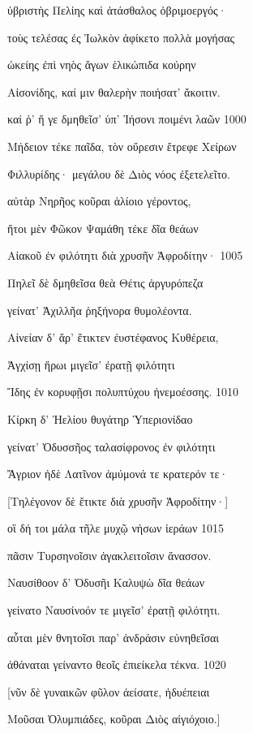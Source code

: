 ὑβριστὴς Πελίης καὶ ἀτάσθαλος ὀβριμοεργός· 

τοὺς τελέσας ἐς Ἰωλκὸν ἀφίκετο πολλὰ μογήσας

ὠκείης ἐπὶ νηὸς ἄγων ἑλικώπιδα κούρην

Αἰσονίδης, καί μιν θαλερὴν ποιήσατ' ἄκοιτιν.

καί ῥ' ἥ γε δμηθεῖσ' ὑπ' Ἰήσονι ποιμένι λαῶν \num{1000} 

Μήδειον τέκε παῖδα, τὸν οὔρεσιν ἔτρεφε Χείρων

Φιλλυρίδης· μεγάλου δὲ Διὸς νόος ἐξετελεῖτο. 

αὐτὰρ Νηρῆος κοῦραι ἁλίοιο γέροντος,

ἤτοι μὲν Φῶκον Ψαμάθη τέκε δῖα θεάων

Αἰακοῦ ἐν φιλότητι διὰ χρυσῆν Ἀφροδίτην· \num{1005} 

Πηλεῖ δὲ δμηθεῖσα θεὰ Θέτις ἀργυρόπεζα

γείνατ' Ἀχιλλῆα ῥηξήνορα θυμολέοντα.

Αἰνείαν δ' ἄρ' ἔτικτεν ἐυστέφανος Κυθέρεια,

Ἀγχίσῃ ἥρωι μιγεῖσ' ἐρατῇ φιλότητι 

Ἴδης ἐν κορυφῇσι πολυπτύχου ἠνεμοέσσης. \num{1010}

Κίρκη δ' Ἠελίου θυγάτηρ Ὑπεριονίδαο

γείνατ' Ὀδυσσῆος ταλασίφρονος ἐν φιλότητι

Ἄγριον ἠδὲ Λατῖνον ἀμύμονά τε κρατερόν τε· 

{[}Τηλέγονον δὲ ἔτικτε διὰ χρυσῆν Ἀφροδίτην·{]}

οἳ δή τοι μάλα τῆλε μυχῷ νήσων ἱεράων \num{1015}

πᾶσιν Τυρσηνοῖσιν ἀγακλειτοῖσιν ἄνασσον.

Ναυσίθοον δ' Ὀδυσῆι Καλυψὼ δῖα θεάων

γείνατο Ναυσίνοόν τε μιγεῖσ' ἐρατῇ φιλότητι. 

αὗται μὲν θνητοῖσι παρ' ἀνδράσιν εὐνηθεῖσαι

ἀθάναται γείναντο θεοῖς ἐπιείκελα τέκνα. \num{1020}

{[}νῦν δὲ γυναικῶν φῦλον ἀείσατε, ἡδυέπειαι

Μοῦσαι Ὀλυμπιάδες, κοῦραι Διὸς αἰγιόχοιο.{]}
